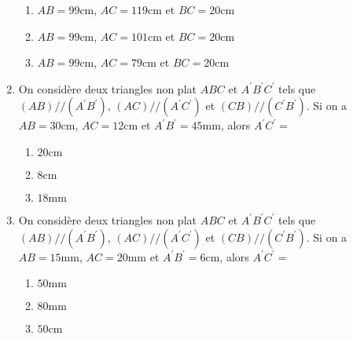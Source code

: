 \documentclass[oneside,twoside]{book}
\begin{document}
\begin{enumerate}
\begin{enumerate}


\item\MauvaiseReponse $AB=99\mathrm{cm}$, $AC=119\mathrm{cm}$ et $BC=20\mathrm{cm}$

\item\BonneReponse $AB=99\mathrm{cm}$, $AC=101\mathrm{cm}$ et $BC=20\mathrm{cm}$

\item\MauvaiseReponse $AB=99\mathrm{cm}$, $AC=79\mathrm{cm}$ et $BC=20\mathrm{cm}$

\end{enumerate}



\item On considère deux triangles non plat $ABC$ et $A^\prime B^\prime C^\prime$ tels que $\left(AB\right)//\left(A^{\prime}B^{\prime}\right)$, $\left(AC\right)//\left(A^{\prime}C^{\prime}\right)$ et $\left(CB\right)//\left(C^{\prime}B^{\prime}\right)$. Si on a $AB=30\mathrm{cm}$, $AC=12\mathrm{cm}$ et $A^{\prime}B^{\prime}=45\mathrm{mm}$, alors $A^{\prime}C^{\prime}=$

\begin{enumerate}


\item\MauvaiseReponse $20\mathrm{cm}$

\item\MauvaiseReponse $8\mathrm{cm}$

\item\BonneReponse $18\mathrm{mm}$

\end{enumerate}




\item On considère deux triangles non plat $ABC$ et $A^\prime B^\prime C^\prime$ tels que $\left(AB\right)//\left(A^{\prime}B^{\prime}\right)$, $\left(AC\right)//\left(A^{\prime}C^{\prime}\right)$ et $\left(CB\right)//\left(C^{\prime}B^{\prime}\right)$. Si on a $AB=15\mathrm{mm}$, $AC=20\mathrm{mm}$ et $A^{\prime}B^{\prime}=6\mathrm{cm}$, alors $A^{\prime}C^{\prime}=$

\begin{enumerate}


\item\MauvaiseReponse $50\mathrm{mm}$

\item\BonneReponse $80\mathrm{mm}$

\item\MauvaiseReponse $50\mathrm{cm}$


\end{enumerate}
\end{enumerate}
\end{document}
